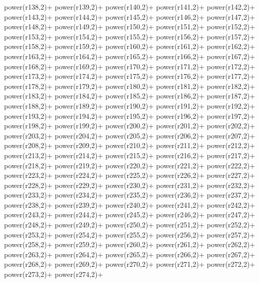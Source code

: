 \begin{DoxyCode}
{    power(r138,2)+
    power(r139,2)+
    power(r140,2)+
    power(r141,2)+
    power(r142,2)+
    power(r143,2)+
    power(r144,2)+
    power(r145,2)+
    power(r146,2)+
    power(r147,2)+
    power(r148,2)+
    power(r149,2)+
    power(r150,2)+
    power(r151,2)+
    power(r152,2)+
    power(r153,2)+
    power(r154,2)+
    power(r155,2)+
    power(r156,2)+
    power(r157,2)+
    power(r158,2)+
    power(r159,2)+
    power(r160,2)+
    power(r161,2)+
    power(r162,2)+
    power(r163,2)+
    power(r164,2)+
    power(r165,2)+
    power(r166,2)+
    power(r167,2)+
    power(r168,2)+
    power(r169,2)+
    power(r170,2)+
    power(r171,2)+
    power(r172,2)+
    power(r173,2)+
    power(r174,2)+
    power(r175,2)+
    power(r176,2)+
    power(r177,2)+
    power(r178,2)+
    power(r179,2)+
    power(r180,2)+
    power(r181,2)+
    power(r182,2)+
    power(r183,2)+
    power(r184,2)+
    power(r185,2)+
    power(r186,2)+
    power(r187,2)+
    power(r188,2)+
    power(r189,2)+
    power(r190,2)+
    power(r191,2)+
    power(r192,2)+
    power(r193,2)+
    power(r194,2)+
    power(r195,2)+
    power(r196,2)+
    power(r197,2)+
    power(r198,2)+
    power(r199,2)+
    power(r200,2)+
    power(r201,2)+
    power(r202,2)+
    power(r203,2)+
    power(r204,2)+
    power(r205,2)+
    power(r206,2)+
    power(r207,2)+
    power(r208,2)+
    power(r209,2)+
    power(r210,2)+
    power(r211,2)+
    power(r212,2)+
    power(r213,2)+
    power(r214,2)+
    power(r215,2)+
    power(r216,2)+
    power(r217,2)+
    power(r218,2)+
    power(r219,2)+
    power(r220,2)+
    power(r221,2)+
    power(r222,2)+
    power(r223,2)+
    power(r224,2)+
    power(r225,2)+
    power(r226,2)+
    power(r227,2)+
    power(r228,2)+
    power(r229,2)+
    power(r230,2)+
    power(r231,2)+
    power(r232,2)+
    power(r233,2)+
    power(r234,2)+
    power(r235,2)+
    power(r236,2)+
    power(r237,2)+
    power(r238,2)+
    power(r239,2)+
    power(r240,2)+
    power(r241,2)+
    power(r242,2)+
    power(r243,2)+
    power(r244,2)+
    power(r245,2)+
    power(r246,2)+
    power(r247,2)+
    power(r248,2)+
    power(r249,2)+
    power(r250,2)+
    power(r251,2)+
    power(r252,2)+
    power(r253,2)+
    power(r254,2)+
    power(r255,2)+
    power(r256,2)+
    power(r257,2)+
    power(r258,2)+
    power(r259,2)+
    power(r260,2)+
    power(r261,2)+
    power(r262,2)+
    power(r263,2)+
    power(r264,2)+
    power(r265,2)+
    power(r266,2)+
    power(r267,2)+
    power(r268,2)+
    power(r269,2)+
    power(r270,2)+
    power(r271,2)+
    power(r272,2)+
    power(r273,2)+
    power(r274,2)+
}
\end{DoxyCode}
